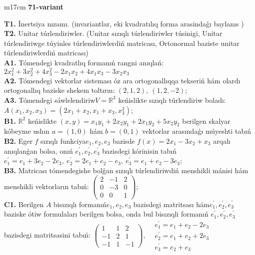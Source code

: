 \documentclass{article}
\begin{document}
\begin{tabular}{m{17cm}}
\textbf{71-variant}
\newline

\textbf{T1.} İnertsiya nızamı. (invariantlar,  eki kvadratılıq forma arasindaǵı baylanıs ) \\
\textbf{T2.} Unitar túrlendiriwler. (Unitar sızıqlı túrlendiriwler túsinigi,  Unitar túrlendiriwge túyinles túrlendiriwlerdiń matricası,   Ortonormal baziste unitar túrlendiriwlerdiń matricası) \\
\textbf{A1.} Tómendegi kvadratlıq formanıń rangni anıqlań: \(2x_{1}^{2} + 3x_{2}^{2} + 4x_{3}^{2} - 2x_{1}x_{2} + 4x_{1}x_{3} - 3x_{2}x_{3}\) \\
\textbf{A2.} Tómendegi vektorlar sisteması óz ara ortogonallıqqa tekseriń hám olardı ortogonallıq baziske shekem toltırın: \((2,1,2),\ (1,2, - 2)\); \\
\textbf{A3.} Tómendegi sáwlelendiriw\(V = \mathbb{R}^{3}\) keńislikte sızıqlı túrlendiriw boladı: \(A\left( x_{1},x_{2},x_{3} \right) = \left( 2x_{1} + x_{2},x_{1} + x_{3},x_{3}^{2} \right)\); \\
\textbf{B1.} \(\mathbb{R}^{2}\) keńislikte \((x,y) = x_{1}y_{1} + 2x_{2}y_{1} + 2x_{1}y_{2} + 5x_{2}y_{2}\) berilgen skalyar kóbeyme ushın \(a = (1,0)\) hám \(b = (0,1)\) vektorlar arasındaǵı múyeshti tabıń \\
\textbf{B2.} Eger \(f\) sızıqlı funkciya\(e_{1},e_{2},e_{3}\) bazisde \(f(x) = 2x_{1} - 3x_{2} + x_{3}\) arqalı anıqlanǵan bolsa, onıń \(e_{1}^{'},e_{2}^{'},e_{3}^{'}\) bazisdegi kórinisin tabıń\(e_{1}^{'} = e_{1} + 3e_{2} - 2e_{3},\ e_{2}^{'} = 2e_{1} + e_{2} - e_{3},\ e_{3}^{'} = e_{1} + e_{2} - 3e_{3}\); \\
\textbf{B3.} Matricası tómendegishe bolǵan sızıqlı túrlendiriwdiń menshikli mánisi hám menshikli vektorların tabıń: \(\begin{pmatrix} 2 & - 1 & 2 \\ 0 & - 3 & 0 \\ 0 & 0 & 1 \end{pmatrix}\); \\
\textbf{C1.} Berilgen \(A\) bisızıqlı formanıń\(e_{1},e_{2},e_{3}\) bazisdegi matritsası hám\(e_{1}^{'},e_{2}^{'},e_{3}^{'}\) baziske ótiw formulaları berilgen bolsa, onda bul bisızıqli formanıń \(e_{1}^{'},e_{2}^{'},e_{3}^{'}\) bazisdegi matritsasini tabıń: \(\begin{pmatrix} 1 & 1 & 2 \\  - 1 & 2 & 1 \\  - 1 & 1 & - 1 \end{pmatrix},\begin{matrix}  & e_{1}^{'} = e_{1} + e_{2} - 2e_{3} \\  & e_{2}^{'} = e_{1} + e_{2} + 2e_{3} \\  & e_{3}^{'} = e_{2} + e_{3} \end{matrix}\) \\

\end{tabular}
\end{document}
